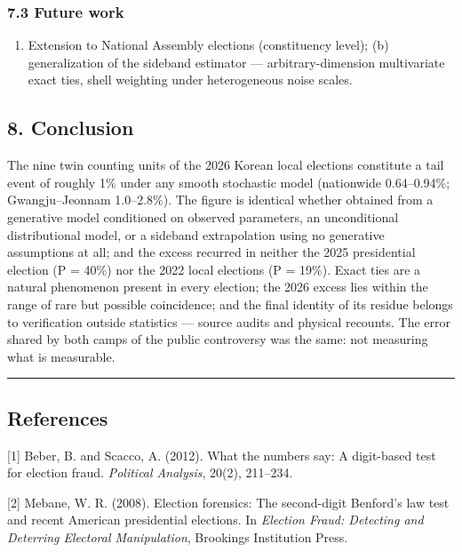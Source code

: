 \documentclass[
  11pt,
]{article}
\providecommand{\tightlist}{%
  \setlength{\itemsep}{0pt}\setlength{\parskip}{0pt}}
\begin{document}
\subsubsection{7.3 Future work}\label{future-work}

\begin{enumerate}
\def\labelenumi{(\alph{enumi})}
\tightlist
\item
  Extension to National Assembly elections (constituency level); (b)
  generalization of the sideband estimator --- arbitrary-dimension
  multivariate exact ties, shell weighting under heterogeneous noise
  scales.
\end{enumerate}

\subsection{8. Conclusion}\label{conclusion}

The nine twin counting units of the 2026 Korean local elections
constitute a tail event of roughly 1\% under any smooth stochastic model
(nationwide 0.64--0.94\%; Gwangju--Jeonnam 1.0--2.8\%). The figure is
identical whether obtained from a generative model conditioned on
observed parameters, an unconditional distributional model, or a
sideband extrapolation using no generative assumptions at all; and the
excess recurred in neither the 2025 presidential election (P = 40\%) nor
the 2022 local elections (P = 19\%). Exact ties are a natural phenomenon
present in every election; the 2026 excess lies within the range of rare
but possible coincidence; and the final identity of its residue belongs
to verification outside statistics --- source audits and physical
recounts. The error shared by both camps of the public controversy was
the same: not measuring what is measurable.

\begin{center}\rule{0.5\linewidth}{0.5pt}\end{center}

\subsection{References}\label{references}

{[}1{]} Beber, B. and Scacco, A. (2012). What the numbers say: A
digit-based test for election fraud. \emph{Political Analysis}, 20(2),
211--234.

{[}2{]} Mebane, W. R. (2008). Election forensics: The second-digit
Benford's law test and recent American presidential elections. In
\emph{Election Fraud: Detecting and Deterring Electoral Manipulation},
Brookings Institution Press.
\end{document}
